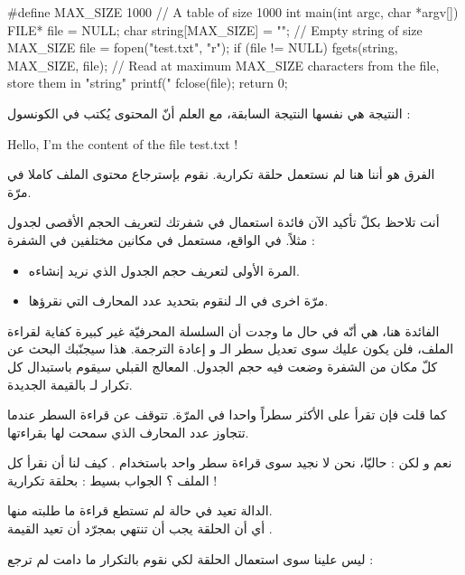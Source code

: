\begin{Csource}
#define MAX_SIZE 1000 // A table of size 1000
int main(int argc, char *argv[])
{
    FILE* file = NULL;
    char string[MAX_SIZE] = ""; // Empty string of size MAX_SIZE
    file = fopen("test.txt", "r");
    if (file != NULL)
    {
        fgets(string, MAX_SIZE, file); // Read at maximum MAX_SIZE characters from the file, store them in  "string"
        printf("%
        fclose(file);
    }
    return 0;
}
\end{Csource}

النتيجة هي نفسها النتيجة السابقة، مع العلم أنّ المحتوى يُكتب في الكونسول :

\begin{Console}
Hello, I'm the content of the file test.txt !
\end{Console}

الفرق هو أننا هنا لم نستعمل حلقة تكرارية. نقوم بإسترجاع محتوى الملف كاملا في مرّة.

أنت تلاحظ بكلّ تأكيد الآن فائدة استعمال
في شفرتك لتعريف الحجم الأقصى لجدول مثلاً. في الواقع،
مستعمل في مكانين مختلفين في الشفرة :
\begin{itemize}
  \item المرة الأولى لتعريف حجم الجدول الذي نريد إنشاءه.
  \item مرّة اخرى في الـ
  لنقوم بتحديد عدد المحارف التي نقرؤها.
\end{itemize}

الفائدة هنا، هي أنّه في حال ما وجدت أن السلسلة المحرفيّة غير كبيرة كفاية لقراءة الملف، فلن يكون عليك سوى تعديل سطر الـ
و إعادة الترجمة. هذا سيجنّبك البحث عن كلّ مكان من الشفرة وضعت فيه حجم الجدول. المعالج القبلي سيقوم باستبدال كل تكرار لـ
بالقيمة الجديدة.

كما قلت فإن
تقرأ على الأكثر سطراً واحدا في المرّة. تتوقف عن قراءة السطر عندما تتجاوز عدد المحارف الذي سمحت لها بقراءتها.

نعم و لكن : حاليّا، نحن لا نجيد سوى قراءة سطر واحد باستخدام
.
كيف لنا أن نقرأ كل الملف ؟ الجواب بسيط : بحلقة تكرارية !

الدالة
تعيد
في حالة لم تستطع قراءة ما طلبته منها.\\
أي أن الحلقة يجب أن تنتهي بمجرّد أن تعيد
القيمة
.

ليس علينا سوى استعمال الحلقة
لكي نقوم بالتكرار ما دامت
لم ترجع
 :

